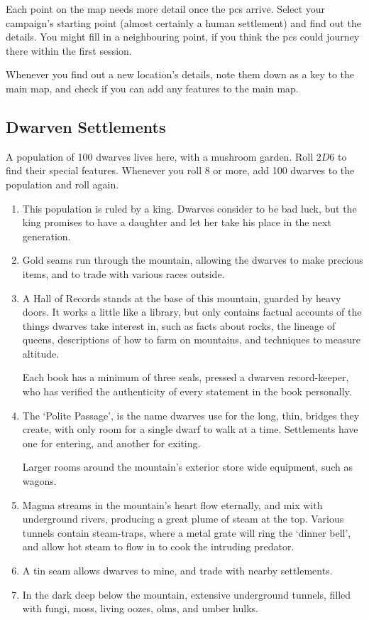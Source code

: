 \begin{multicols}{2}

\noindent
Each point on the map needs more detail once the \glspl{pc} arrive.
Select your campaign's starting point (almost certainly a human settlement) and find out the details.
You might fill in a neighbouring point, if you think the \glspl{pc} could journey there within the first session.

Whenever you find out a new location's details, note them down as a key to the main map, and check if you can add any features to the main map.

\subsection{Dwarven Settlements}

A population of 100 dwarves lives here, with a mushroom garden.
Roll $2D6$ to find their special features.
Whenever you roll 8 or more, add 100 dwarves to the population and roll again.

\begin{enumerate}
  \item
  This population is ruled by a king.
  Dwarves consider to be bad luck, but the king promises to have a daughter and let her take his place in the next generation.
  \item
  Gold seams run through the mountain, allowing the dwarves to make precious items, and to trade with various races outside.
  \item
  A Hall of Records stands at the base of this mountain, guarded by heavy doors.
  It works a little like a library, but only contains factual accounts of the things dwarves take interest in, such as facts about rocks, the lineage of queens, descriptions of how to farm on mountains, and techniques to measure altitude.

  Each book has a minimum of three seals, pressed a dwarven record-keeper, who has verified the authenticity of every statement in the book personally.
  \item
  The `Polite Passage', is the name dwarves use for the long, thin, bridges they create, with only room for a single dwarf to walk at a time.
  Settlements have one for entering, and another for exiting.

  Larger rooms around the mountain's exterior store wide equipment, such as wagons.
  \item
  Magma streams in the mountain's heart flow eternally, and mix with underground rivers, producing a great plume of steam at the top.
  Various tunnels contain steam-traps, where a metal grate will ring the `dinner bell', and allow hot steam to flow in to cook the intruding predator.
  \item
  A tin seam allows dwarves to mine, and trade with nearby settlements.
  \item
  In the dark \gls{deep} below the mountain, extensive underground tunnels, filled with fungi, moss, living oozes, olms, and umber hulks.


\end{enumerate}
\end{multicols}
